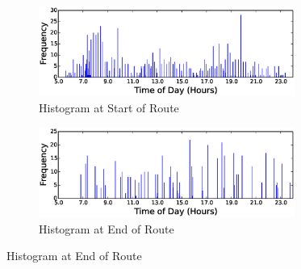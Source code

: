 \documentclass{sig-alternate}
\begin{document}
\begin{figure}[htb]
	\centering
	\begin{subfigure}{3.3in}
		\includegraphics[width=3.3in]{7_start} %
		\caption{Histogram at Start of Route}
		\label{fig:7_start}
	\end{subfigure}
	\begin{subfigure}{3.3in}
		\includegraphics[width=3.3in]{7_end} %
		\caption{Histogram at End of Route}
		\label{fig:7_start}
	\end{subfigure}
\end{figure}
\end{document}
